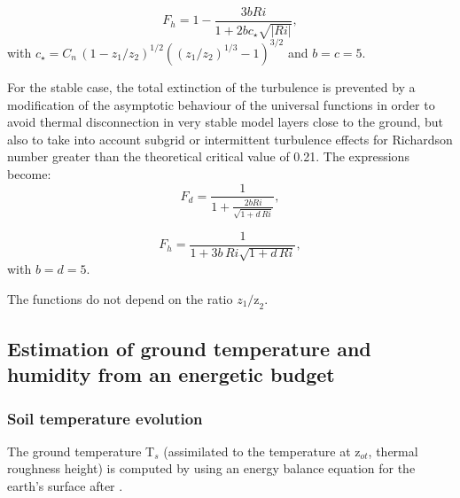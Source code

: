 \begin{equation}
\label{eq19}
F_{h}
=1-\frac{{3bRi}}{1+{2bc}_{\star} \sqrt
{\left| {{Ri}} \right|} },
\end{equation}
with $c_{\star} =C_{n} \, \left(
{1-z_{1} /z_{2} }
\right)^{1/2}\left( {(z_{1} /z_{2}
)^{1/3}-1} \right)^{3/2}$ and $b = c = 5$.

For the stable case, the total extinction of the turbulence is prevented by
a modification of the asymptotic behaviour of the universal functions in
order to avoid thermal disconnection in very stable model layers close to
the ground, but also to take into account subgrid or intermittent turbulence
effects for Richardson number greater than the theoretical critical value of
0.21. The expressions become:
\begin{equation}
\label{eq20}
F_{d} =\frac{1}{1+\frac{2bRi}{\sqrt
{1+d\, Ri} }},
\end{equation}

\begin{equation}
\label{eq21}
F_{h} =\frac{1}{1+ 3 b \, Ri\sqrt
{1+ d \, Ri} },
\end{equation}
with $b = d = 5$.

The functions do not depend on the ratio $z_{1}
\mbox{/z}_{2} $.

\subsection{Estimation of ground temperature and humidity from an energetic budget}

\subsubsection{Soil temperature evolution}
The ground temperature T$_{s}$ (assimilated to the temperature at z$_{ot}$,
thermal roughness height) is computed by using an energy balance equation
for the earth's surface after \cite{Deardorff:1978}.

